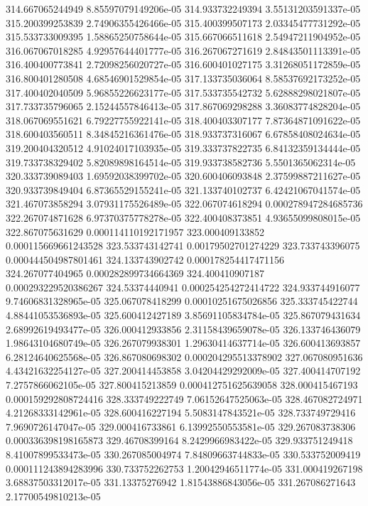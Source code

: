 {314.667065244949 8.85597079149206e-05
314.933732249394 3.55131203591337e-05
315.200399253839 2.74906355426466e-05
315.400399507173 2.03345477731292e-05
315.533733009395 1.58865250758644e-05
315.667066511618 2.54947211904952e-05
316.067067018285 4.92957644401777e-05
316.267067271619 2.84843501113391e-05
316.400400773841 2.72098256020727e-05
316.600401027175 3.31268051172859e-05
316.800401280508 4.68546901529854e-05
317.133735036064 8.58537692173252e-05
317.400402040509 5.96855226623177e-05
317.533735542732 5.62888298021807e-05
317.733735796065 2.15244557846413e-05
317.867069298288 3.36083774828204e-05
318.067069551621 6.79227755922141e-05
318.400403307177 7.87364871091622e-05
318.600403560511 8.34845216361476e-05
318.933737316067 6.67858408024634e-05
319.200404320512 4.91024017103935e-05
319.333737822735 6.84132359134444e-05
319.733738329402 5.82089898164514e-05
319.933738582736 5.5501365062314e-05
320.333739089403 1.69592038399702e-05
320.600406093848 2.37599887211627e-05
320.933739849404 6.87365529155241e-05
321.133740102737 6.42421067041574e-05
321.467073858294 3.07931175526489e-05
322.067074618294 0.000278947284685736
322.267074871628 6.97370375778278e-05
322.400408373851 4.93655099808015e-05
322.867075631629 0.000114110192171957
323.000409133852 0.000115669661243528
323.533743142741 0.00179502701274229
323.733743396075 0.000444504987801461
324.133743902742 0.000178254417471156
324.267077404965 0.000282899734664369
324.400410907187 0.000293229520386267
324.53374440941 0.000254254272414722
324.933744916077 9.74606831328965e-05
325.067078418299 0.00010251675026856
325.333745422744 4.88441053536893e-05
325.600412427189 3.85691105834784e-05
325.867079431634 2.68992619493477e-05
326.000412933856 2.31158439659078e-05
326.133746436079 1.98643104680749e-05
326.267079938301 1.29630414637714e-05
326.600413693857 6.28124640625568e-05
326.867080698302 0.000204295513378902
327.067080951636 4.43421632254127e-05
327.200414453858 3.04204429292009e-05
327.400414707192 7.2757866062105e-05
327.800415213859 0.000412751625639058
328.000415467193 0.000159292808724416
328.333749222749 7.06152647525063e-05
328.467082724971 4.21268333142961e-05
328.600416227194 5.5083147843521e-05
328.733749729416 7.9690726147047e-05
329.000416733861 6.13992550553581e-05
329.267083738306 0.000336398198165873
329.46708399164 8.2429966983422e-05
329.933751249418 8.41007899533473e-05
330.267085004974 7.84809663744833e-05
330.533752009419 0.000111243894283996
330.733752262753 1.20042946511774e-05
331.000419267198 3.68837503312017e-05
331.13375276942 1.81543886843056e-05
331.267086271643 2.17700549810213e-05
}
